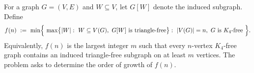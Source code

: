 For a graph $G=(V,E)$ and $W\subseteq V$, let $G[W]$ denote the induced subgraph.
Define
\[
 f(n)\ :=\ \min\Bigl\{\ \max\bigl\{|W|:\ W\subseteq V(G),\ \text{$G[W]$ is triangle-free}\bigr\}:\ |V(G)|=n,\ \text{$G$ is $K_4$-free}\ \Bigr\}.
\]
Equivalently, $f(n)$ is the largest integer $m$ such that every $n$-vertex $K_4$-free graph contains an induced triangle-free subgraph on at least $m$ vertices.
The problem asks to determine the order of growth of $f(n)$.
